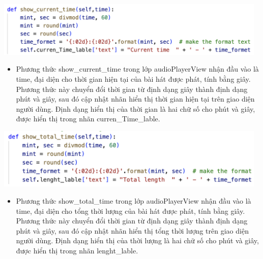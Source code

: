 \documentclass[a4paper]{article}
\begin{document}
\begin{center}
\includegraphics[width=130mm]{template_SGU 2/audio_showCurrentTime.png}
\end{center}
\begin{itemize}
    \item Phương thức show\_current\_time trong lớp audioPlayerView nhận đầu vào là time, đại diện cho thời gian hiện tại của bài hát được phát, tính bằng giây. Phương thức này chuyển đổi thời gian từ định dạng giây thành định dạng phút và giây, sau đó cập nhật nhãn hiển thị thời gian hiện tại trên giao diện người dùng. Định dạng hiển thị của thời gian là hai chữ số cho phút và giây, được hiển thị trong nhãn curren\_Time\_lable.
\end{itemize}

\begin{center}
\includegraphics[width=130mm]{template_SGU 2/audio_showTotalTime.png}
\end{center}
\begin{itemize}
    \item Phương thức show\_total\_time trong lớp audioPlayerView nhận đầu vào là time, đại diện cho tổng thời lượng của bài hát được phát, tính bằng giây. Phương thức này chuyển đổi thời gian từ định dạng giây thành định dạng phút và giây, sau đó cập nhật nhãn hiển thị tổng thời lượng trên giao diện người dùng. Định dạng hiển thị của thời lượng là hai chữ số cho phút và giây, được hiển thị trong nhãn lenght\_lable.
\end{itemize}
\end{document}
